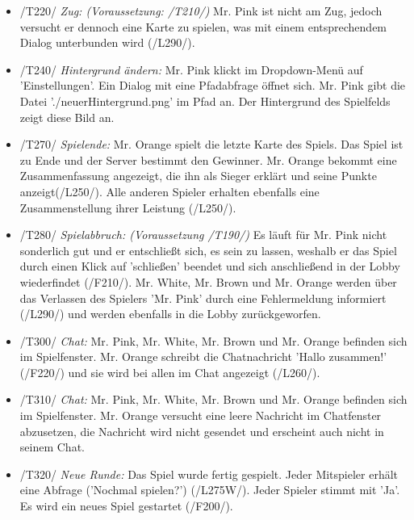 \documentclass{article}
\begin{document}
\begin{itemize}
\begin{itemize}
		\item /T220/ \textit{Zug: (Voraussetzung: /T210/)} Mr. Pink ist nicht am Zug, jedoch versucht er dennoch eine Karte zu spielen, was mit einem entsprechendem Dialog  unterbunden wird (/L290/).
		
		\item /T240/ \textit{Hintergrund ändern:} Mr. Pink klickt im Dropdown-Menü auf 'Einstellungen'. Ein Dialog mit eine Pfadabfrage öffnet sich. Mr. Pink gibt die Datei './neuerHintergrund.png' im Pfad an. Der Hintergrund des Spielfelds zeigt diese Bild an.
		
		\item /T270/ \textit{Spielende:} Mr. Orange spielt die letzte Karte des Spiels. Das Spiel ist zu Ende und der \gls{Server} bestimmt den Gewinner. Mr. Orange bekommt eine Zusammenfassung angezeigt, die ihn als Sieger erklärt und seine Punkte anzeigt(/L250/). Alle anderen Spieler erhalten ebenfalls eine Zusammenstellung ihrer Leistung (/L250/).
		
		\item /T280/ \textit{Spielabbruch: (Voraussetzung /T190/)} Es läuft für Mr. Pink nicht sonderlich gut und er entschließt sich, es sein zu lassen, weshalb er das Spiel durch einen Klick auf 'schließen' beendet und sich anschließend in der \gls{Lobby} wiederfindet (/F210/). Mr. White, Mr. Brown und Mr. Orange werden über das Verlassen des Spielers 'Mr. Pink' durch eine Fehlermeldung informiert (/L290/) und werden ebenfalls in die \gls{Lobby} zurückgeworfen.
	
		\item /T300/ \textit{Chat:} Mr. Pink, Mr. White, Mr. Brown und Mr. Orange befinden sich im Spielfenster. Mr. Orange schreibt die Chatnachricht 'Hallo zusammen!' (/F220/) und sie wird bei allen im Chat angezeigt (/L260/).
	
		\item /T310/ \textit{Chat:} Mr. Pink, Mr. White, Mr. Brown und Mr. Orange befinden sich im Spielfenster. Mr. Orange versucht eine leere Nachricht im Chatfenster abzusetzen, die Nachricht wird nicht gesendet und erscheint auch nicht in seinem Chat.
		
		\item /T320/ \textit{Neue Runde:} Das Spiel wurde fertig gespielt. Jeder Mitspieler erhält eine Abfrage ('Nochmal spielen?') (/L275W/). Jeder Spieler stimmt mit 'Ja'. Es wird ein neues Spiel gestartet (/F200/).
			
	\end{itemize}
	

\end{itemize}
\end{document}
